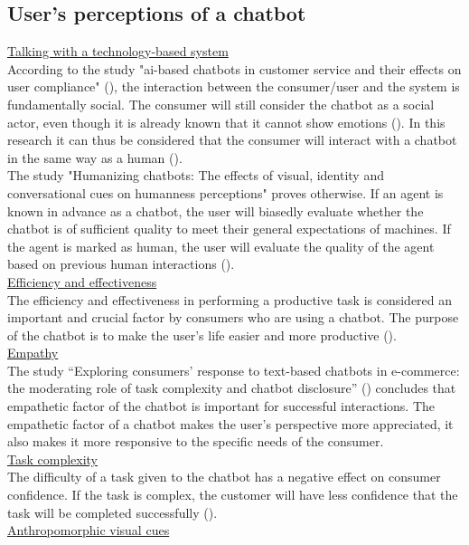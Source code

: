 \subsection{User’s perceptions of a chatbot}
\ul{Talking with a technology-based system}\\
According to the study "\acrshort{ai}-based chatbots in customer service and their effects on user compliance" (\cite{Adam2021}), the interaction between the consumer/user and the system is fundamentally social. The consumer will still consider the chatbot as a social actor, even though it is already known that it cannot show emotions (\cite{Adam2021}). In this research it can thus be considered that the consumer will interact with a chatbot in the same way as a human (\cite{Cheng2021,Ischen2020}).\\
\break
The study "Humanizing chatbots: The effects of visual, identity and conversational cues on humanness perceptions" proves otherwise. If an agent is known in advance as a chatbot, the user will biasedly evaluate whether the chatbot is of sufficient quality to meet their general expectations of machines. If the agent is marked as human, the user will evaluate the quality of the agent based on previous human interactions (\cite{Go2019,Shyam2008}).\\
\break
\ul{Efficiency and effectiveness}\\
The efficiency and effectiveness in performing a productive task is considered an important and crucial factor by consumers who are using a chatbot. The purpose of the chatbot is to make the user's life easier and more productive (\cite{Brandtzaeg2018}).\\
\break
\ul{Empathy}\\
The study “Exploring consumers' response to text-based chatbots in e-commerce: the moderating role of task complexity and chatbot disclosure” (\cite{Cheng2021}) concludes that empathetic factor of the chatbot is important for successful interactions. The empathetic factor of a chatbot makes the user's perspective more appreciated, it also makes it more responsive to the specific needs of the consumer.\\
\break
\ul{Task complexity}\\
The difficulty of a task given to the chatbot has a negative effect on consumer confidence. If the task is complex, the customer will have less confidence that the task will be completed successfully (\cite{Cheng2021}).\\
\break
\ul{Anthropomorphic visual cues}\\
